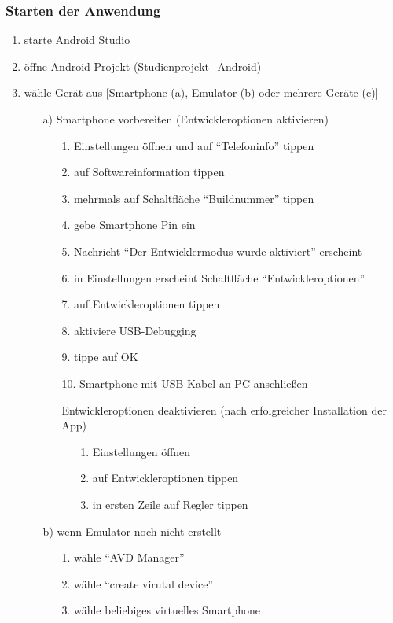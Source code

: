\documentclass[12pt, onecolumn, notitlepage]{scrartcl}
\begin{document}
\subsubsection{Starten der Anwendung}
\begin{enumerate}
	\setlength\itemsep{0.07em}
	\item starte Android Studio
	\item öffne Android Projekt (Studienprojekt\_Android)
	\item wähle Gerät aus [Smartphone (a), Emulator (b) oder mehrere Geräte (c)]
	\begin{itemize}
		\item[a)] Smartphone vorbereiten (Entwickleroptionen aktivieren)
		\begin{enumerate}
			\item[1.] Einstellungen öffnen und auf \enquote{Telefoninfo} tippen
			\item[2.] auf Softwareinformation tippen
			\item[3.] mehrmals auf Schaltfläche \enquote{Buildnummer} tippen
			\item[4.] gebe Smartphone Pin ein
			\item[5.] Nachricht \enquote{Der Entwicklermodus wurde aktiviert} erscheint
			\item[6.] in Einstellungen erscheint Schaltfläche \enquote{Entwickleroptionen}
			\item[7.] auf Entwickleroptionen tippen
			\item[8.] aktiviere USB-Debugging
			\item[9.] tippe auf OK
			\item[10.] Smartphone mit USB-Kabel an PC anschließen
			\item[] Entwickleroptionen deaktivieren (nach erfolgreicher Installation der App)
			\begin{itemize}
				\item[1.] Einstellungen öffnen
				\item[2.] auf Entwickleroptionen tippen
				\item[3.] in ersten Zeile auf Regler tippen
			\end{itemize}
		\end{enumerate}
		\item[b)] wenn Emulator noch nicht erstellt
			\begin{itemize}
			\item[1.] wähle \enquote{AVD Manager}
			\item[2.] wähle \enquote{create virutal device}
			\item[3.] wähle beliebiges virtuelles Smartphone

\end{itemize}
\end{itemize}
\end{enumerate}
\end{document}
